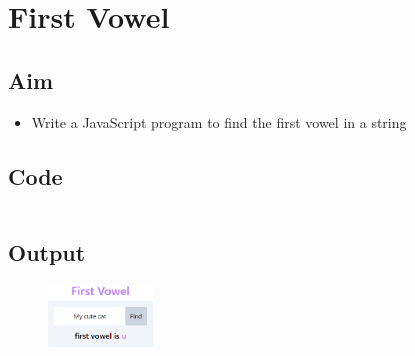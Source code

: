 \documentclass{article}
\begin{document}
\section{First Vowel}
\subsection{Aim}
\begin{itemize}
	\item Write a JavaScript program to find the first vowel in a string
\end{itemize}

\subsection{Code}
\inputminted[frame=lines, linenos, breaklines, breakanywhere, numberblanklines=false]{html}{./prog_12/index.html}

\subsection{Output}
\begin{figure}[h!]
	\centering
	\includegraphics[width=0.25\textwidth]{./Assets/p12.png}
\end{figure}
\newpage
\end{document}
